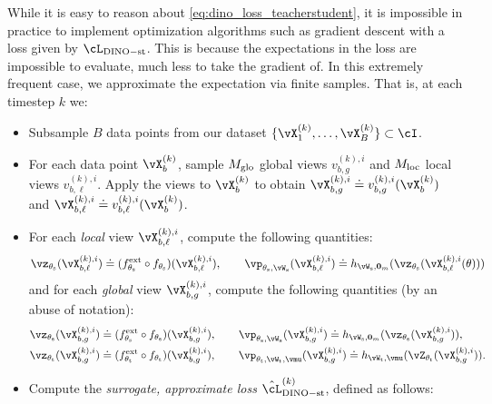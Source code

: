 \documentclass[../../book-main.tex]{subfiles}
\begin{document}
While it is easy to reason about \eqref{eq:dino_loss_teacherstudent}, it is impossible in practice to implement optimization algorithms such as gradient descent with a loss given by \(\cL_{\dino{}-\student\teacher}\). This is because the expectations in the loss are impossible to evaluate, much less to take the gradient of. In this extremely frequent case, we approximate the expectation via finite samples. That is, at each timestep \(k\) we:
\begin{itemize}
    \item Subsample \(B\) data points from our dataset \(\{\vX_{1}^{(k)}, \dots, \vX_{B}^{(k)}\} \subset \cI\).
    \item For each data point \(\vX_{b}^{(k)}\), sample \(M_{\mathrm{glo}}\) global views \(v_{b, g}^{(k), i}\) and \(M_{\mathrm{loc}}\) local views \(v_{b, \ell}^{(k), i}\). Apply the views to \(\vX_{b}^{(k)}\) to obtain \(\vX_{b, g}^{(k), i} \doteq v_{b, g}^{(k), i}(\vX_{b}^{(k)})\) and \(\vX_{b, \ell}^{(k), i} \doteq v_{b, \ell}^{(k), i}(\vX_{b}^{(k)})\).
    \item For each \textit{local} view \(\vX_{b, \ell}^{(k), i}\), compute the following quantities:
    \begin{equation}
        \vz_{\theta_{\student}}(\vX_{b, \ell}^{(k), i}) \doteq (f_{\theta_{\student}}^{\ext} \circ f_{\theta_{\student}})(\vX_{b, \ell}^{(k), i}), \qquad \vp_{\theta_{\student}, \vW_{\student}}(\vX_{b, \ell}^{(k), i}) \doteq h_{\vW_{\student}, \vzero_{m}}(\vz_{\theta_{\student}}(\vX_{b, \ell}^{(k), i}(\theta)))
    \end{equation}
    and for each \textit{global} view \(\vX_{b, g}^{(k), i}\), compute the following quantities (by an abuse of notation):
    \begin{align}
        &\vz_{\theta_{\student}}(\vX_{b, g}^{(k), i}) \doteq (f_{\theta_{\student}}^{\ext} \circ f_{\theta_{\student}})(\vX_{b, g}^{(k), i}), \qquad \vp_{\theta_{\student}, \vW_{\student}}(\vX_{b, g}^{(k), i}) \doteq h_{\vW_{\student}, \vzero_{m}}(\vz_{\theta_{\student}}(\vX_{b, g}^{(k), i})), \\
        &\vz_{\theta_{\teacher}}(\vX_{b, g}^{(k), i}) \doteq (f_{\theta_{\teacher}}^{\ext} \circ f_{\theta_{\teacher}})(\vX_{b, g}^{(k), i}), \qquad \vp_{\theta_{\teacher}, \vW_{\teacher}, \vmu}(\vX_{b, g}^{(k), i}) \doteq h_{\vW_{\teacher}, \vmu}(\vZ_{\theta_{\teacher}}(\vX_{b, g}^{(k), i})).
    \end{align}
    \item Compute the \textit{surrogate, approximate loss} \(\hat{\cL}_{\dino-\student\teacher}^{(k)}\), defined as follows: 

\end{itemize}
\end{document}
